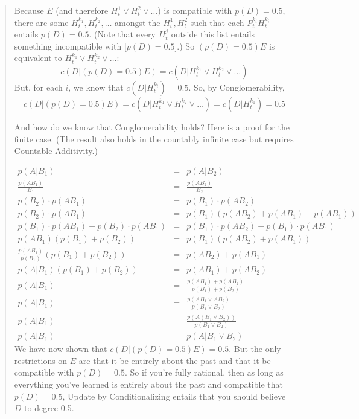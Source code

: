 \documentclass[12pt,letterpaper]{article}
\begin{document}
\begin{enumerate}
\begin{enumerate}
{\begin{quote}
Because $E$ (and therefore $H^1_t \vee H^2_t \vee \dots$) is compatible with $p(D) = 0.5$, there are some $H^{k_1}_t,H^{k_2}_t,\dots$ amongst the $H^1_t,H^2_t$  such that each $P^{k_i}_tH^{k_i}_t$ entails $p(D) = 0.5$. (Note that every $H^j_t$ outside this list entails something incompatible with [$p(D) = 0.5$].) So $(p(D) = 0.5)E$ is equivalent to $H^{k_1}_t \vee H^{k_2}_t \vee \dots$:
$$c(D|(p(D) = 0.5)E) = c(D|H^{k_1}_t \vee H^{k_2}_t \vee \dots)$$
But, for each $i$, we know that $c(D|H^{k_i}_t) = 0.5$. So, by Conglomerability,
$$c(D|(p(D) = 0.5)E) = c(D|H^{k_1}_t \vee H^{k_2}_t \vee \dots) = c(D|H^{k_1}_t) =0.5$$

And how do we know that Conglomerability holds? Here is a proof for the finite case. (The result also holds in the countably infinite case but requires Countable Additivity.)

 \[ \begin{array}{rcl}
p(A|B_1) &=  &p(A|B_2)\\
\frac{p(AB_1)}{B_1}&=  &\frac{p(AB_2)}{B_2}\\
p(B_2)\cdot p(AB_1) &=  &p(B_1)\cdot p(AB_2)\\
p(B_2)\cdot p(AB_1) &=  &p(B_1)( p(AB_2) + p(AB_1) - p(AB_1)) \\
 p(B_1)\cdot p(AB_1)+p(B_2)\cdot p(AB_1) &=  &p(B_1)\cdot p(AB_2) + p(B_1)\cdot p(AB_1) \\
 p(AB_1)(p(B_1)+p(B_2)) &=  &p(B_1) (p(AB_2) + p(AB_1)) \\
 \frac{p(AB_1)}{p(B_1)}(p(B_1)+p(B_2)) &=  & p(AB_2) + p(AB_1) \\
 p(A|B_1)(p(B_1)+p(B_2)) &=  & p(AB_1) + p(AB_2) \\
 p(A|B_1) &=  &\frac{ p(AB_1) + p(AB_2)}{p(B_1)+p(B_2)} \\
  p(A|B_1) &=  &\frac{ p(AB_1 \vee AB_2)}{p(B_1 \vee B_2)} \\
  p(A|B_1) &=  &\frac{ p(A(B_1 \vee B_2))}{p(B_1 \vee B_2)} \\
  p(A|B_1) &=  &p(A|B_1 \vee B_2)
 \end{array}\] 
We have now shown that $c(D|(p(D) = 0.5)E) = 0.5$.  But the only restrictions on $E$ are that it be entirely about the past and that it be compatible with $p(D) = 0.5$. So if you're fully rational, then as long as everything you've learned is entirely about the past and compatible that $p(D) = 0.5$, Update by Conditionalizing entails that you should believe $D$ to degree 0.5.

\end{quote}

}
\end{enumerate}
\end{enumerate}
\end{document}
